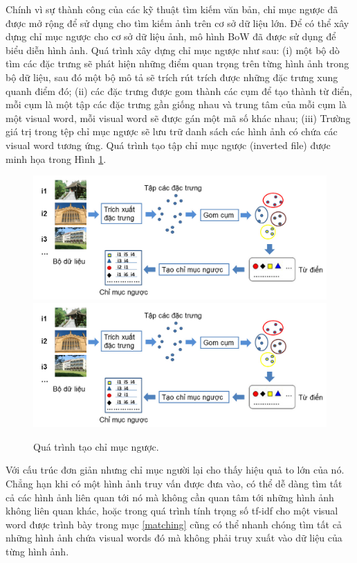 Chính vì sự thành công của các kỹ thuật tìm kiếm văn bản, chỉ mục ngược đã được mở rộng để sử dụng cho tìm kiếm ảnh trên cơ sở dữ liệu lớn. Để có thể xây dựng chỉ mục ngược cho cơ sở dữ liệu ảnh, mô hình BoW đã được sử dụng để biểu diễn hình ảnh. Quá trình xây dựng chỉ mục ngược như sau: (i) một bộ dò tìm các đặc trưng sẽ phát hiện những điểm quan trọng trên từng hình ảnh trong bộ dữ liệu, sau đó một bộ mô tả sẽ trích rút trích được những đặc trưng xung quanh điểm đó; (ii) các đặc trưng được gom thành các cụm để tạo thành từ điển, mỗi cụm là một tập các đặc trưng gần giống nhau và trung tâm của mỗi cụm là một visual word, mỗi visual word sẽ được gán một mã số khác nhau; (iii) Trường giá trị trong tệp chỉ mục ngược sẽ lưu trữ danh sách các hình ảnh có chứa các visual word tương ứng. Quá trình tạo tập chỉ mục ngược (inverted file) được minh họa trong Hình \ref{FigInvertedFile}.

\begin{figure}[!htbp]
  \begin{center}
    \leavevmode
    \ifpdf
      \includegraphics[scale=0.35]{invertedFile}
    \else
      \includegraphics[scale=0.35]{invertedFile}
    \fi
    \caption[Quá trình tạo chỉ mục ngược]{Quá trình tạo chỉ mục ngược.}
    \label{FigInvertedFile}
  \end{center}
\end{figure}

Với cấu trúc đơn giản nhưng chỉ mục người lại cho thấy hiệu quả to lớn của nó. Chẳng hạn khi có một hình ảnh truy vấn được đưa vào, có thể dễ dàng tìm tất cả các hình ảnh liên quan tới nó mà không cần quan tâm tới những hình ảnh không liên quan khác, hoặc trong quá trình tính trọng số tf-idf cho một visual word được trình bày trong mục \ref{matching} cũng có thể nhanh chóng tìm tất cả những hình ảnh chứa visual words đó mà không phải truy xuất vào dữ liệu của từng hình ảnh.

